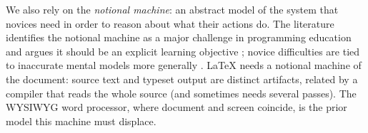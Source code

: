 We also rely on the \emph{notional machine}: an abstract model of the
system that novices need in order to reason about what their actions do.
The literature identifies the notional machine as a major challenge in
programming education and argues it should be an explicit learning
objective \autocite{Sorva2013NotionalMachines,DuBoulay1981BlackBox};
novice difficulties are tied to inaccurate mental models more generally
\autocite{QianLehman2017Misconceptions,BenAri1998Constructivism}.
LaTeX needs a notional machine of the document: source text and typeset
output are distinct artifacts, related by a compiler that reads the whole
source (and sometimes needs several passes).
The WYSIWYG word processor, where document and screen coincide, is the
prior model this machine must displace.
